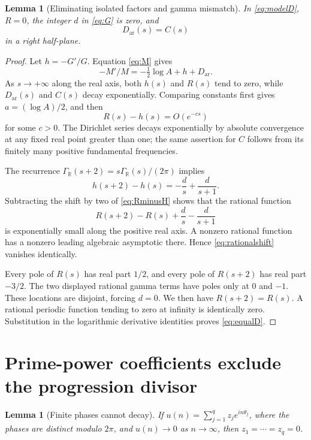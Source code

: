 \documentclass[11pt]{article}
\newtheorem{lemma}[theorem]{Lemma}
\theoremstyle{definition}
\theoremstyle{remark}
\newcommand{\R}{\mathbb R}
\newcommand{\Gr}{\Gamma_{\R}}
\numberwithin{equation}{section}
\begin{document}
\begin{lemma}[Eliminating isolated factors and gamma mismatch]\label{lem:gamma}
In \eqref{eq:modelD}, $R=0$, the integer $d$ in \eqref{eq:G} is zero, and
\begin{equation}\label{eq:equalD}
D_{\mathrm{ar}}(s)=C(s)
\end{equation}
in a right half-plane.
\end{lemma}

\begin{proof}
Let $h=-G'/G$. Equation \eqref{eq:M} gives
\[
-M'/M=-\tfrac12\log A+h+D_{\mathrm{ar}}.
\]
As $s\to+\infty$ along the real axis, both $h(s)$ and $R(s)$ tend to zero, while $D_{\mathrm{ar}}(s)$ and $C(s)$ decay exponentially. Comparing constants first gives $a=(\log A)/2$, and then
\begin{equation}\label{eq:RminusH}
R(s)-h(s)=O(e^{-cs})
\end{equation}
for some $c>0$. The Dirichlet series decays exponentially by absolute convergence at any fixed real point greater than one; the same assertion for $C$ follows from its finitely many positive fundamental frequencies.

The recurrence $\Gr(s+2)=s\Gr(s)/(2\pi)$ implies
\[
h(s+2)-h(s)=-\frac d s+\frac d{s+1}.
\]
Subtracting the shift by two of \eqref{eq:RminusH} shows that the rational function
\begin{equation}\label{eq:rationalshift}
R(s+2)-R(s)+\frac d s-\frac d{s+1}
\end{equation}
is exponentially small along the positive real axis. A nonzero rational function has a nonzero leading algebraic asymptotic there. Hence \eqref{eq:rationalshift} vanishes identically.

Every pole of $R(s)$ has real part $1/2$, and every pole of $R(s+2)$ has real part $-3/2$. The two displayed rational gamma terms have poles only at $0$ and $-1$. These locations are disjoint, forcing $d=0$. We then have $R(s+2)=R(s)$. A rational periodic function tending to zero at infinity is identically zero. Substitution in the logarithmic derivative identities proves \eqref{eq:equalD}.
\end{proof}

\section{Prime-power coefficients exclude the progression divisor}

\begin{lemma}[Finite phases cannot decay]\label{lem:phases}
If $u(n)=\sum_{j=1}^qz_je^{in\theta_j}$, where the phases are distinct modulo $2\pi$, and $u(n)\to0$ as $n\to\infty$, then $z_1=\cdots=z_q=0$.
\end{lemma}
\end{document}
